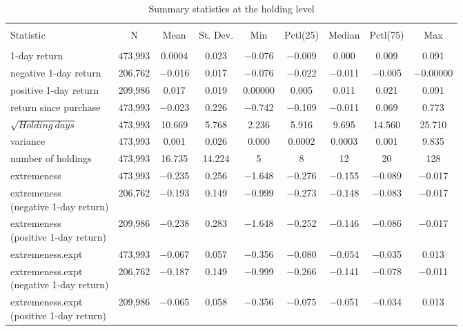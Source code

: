 
\begin{table}[!htbp] \centering 
	\small
  \caption{Summary statistics at the holding level} 
  \label{} 
\begin{tabular}{@{\extracolsep{0pt}}lcccccccc} 		
	\\[-1.8ex]\hline 
	\hline \\[-1.8ex] 
	Statistic & \multicolumn{1}{c}{N} & \multicolumn{1}{c}{Mean} & \multicolumn{1}{c}{St. Dev.} & \multicolumn{1}{c}{Min} & \multicolumn{1}{c}{Pctl(25)} & \multicolumn{1}{c}{Median} & \multicolumn{1}{c}{Pctl(75)} & \multicolumn{1}{c}{Max} \\ 
	\hline \\[-1.8ex] 
	1-day return & 473,993 & 0.0004 & 0.023 & $-$0.076 & $-$0.009 & 0.000 & 0.009 & 0.091 \\ 
	negative 1-day return  & 206,762 & $-$0.016 & 0.017 & $-$0.076 & $-$0.022 & $-$0.011 & $-$0.005 & $-$0.00000 \\ 
	positive 1-day return & 209,986 & 0.017 & 0.019 & 0.00000 & 0.005 & 0.011 & 0.021 & 0.091 \\ 
	return since purchase & 473,993 & $-$0.023 & 0.226 & $-$0.742 & $-$0.109 & $-$0.011 & 0.069 & 0.773 \\ 
	$\sqrt{Holding\:days}$ & 473,993 & 10.669 & 5.768 & 2.236 & 5.916 & 9.695 & 14.560 & 25.710 \\ 
	variance & 473,993 & 0.001 & 0.026 & 0.000 & 0.0002 & 0.0003 & 0.001 & 9.835 \\ 
	number of holdings & 473,993 & 16.735 & 14.224 & 5 & 8 & 12 & 20 & 128 \\ 

	extremeness & 473,993 & $-$0.235 & 0.256 & $-$1.648 & $-$0.276 & $-$0.155 & $-$0.089 & $-$0.017 \\
	\makecell[l]{extremeness \\(negative 1-day return)}  & 206,762 & $-$0.193 & 0.149 & $-$0.999 & $-$0.273 & $-$0.148 & $-$0.083 & $-$0.017 \\ 
	\makecell[l]{extremeness \\(positive 1-day return)} & 209,986 & $-$0.238 & 0.283 & $-$1.648 & $-$0.252 & $-$0.146 & $-$0.086 & $-$0.017 \\ 
	
   extremeness.expt & 473,993 & $-$0.067 & 0.057 & $-$0.356 & $-$0.080 & $-$0.054 & $-$0.035 & 0.013 \\ 
   \makecell[l]{extremeness.expt \\(negative 1-day return)} & 206,762 & $-$0.187 & 0.149 & $-$0.999 & $-$0.266 & $-$0.141 & $-$0.078 & $-$0.011 \\ 
   \makecell[l]{extremeness.expt \\(positive 1-day return)}  & 209,986 & $-$0.065 & 0.058 & $-$0.356 & $-$0.075 & $-$0.051 & $-$0.034 & 0.013 \\ 


\end{tabular}
\end{table}
